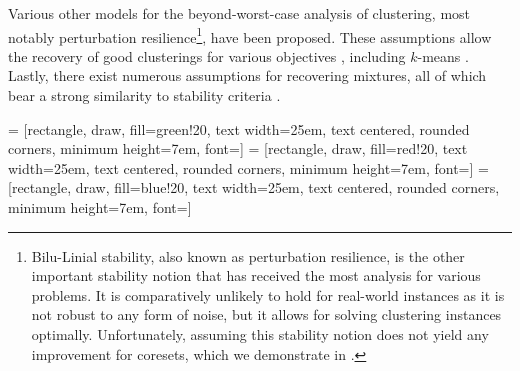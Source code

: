 \documentclass[11pt]{article}
\theoremstyle{restate}
\theoremstyle{definition}
\begin{document}
Various other models for the beyond-worst-case analysis of clustering, most notably perturbation resilience\footnote{Bilu-Linial stability, also known as perturbation resilience, is the other important stability notion that has received the most analysis for various problems. It is comparatively unlikely to hold for real-world instances as it is not robust to any form of noise, but it allows for solving clustering instances optimally. Unfortunately, assuming this stability notion does not yield any improvement for coresets, which we demonstrate in .}\cite{BiL12}, have been proposed.  These assumptions allow the recovery of good clusterings for various objectives  \cite{ABS12,BalcanHW20,BalcanL16,MakarychevMV14}, including $k$-means \cite{AngelidakisMM17}.
Lastly, there exist numerous assumptions for recovering mixtures, all of which bear a strong similarity to stability criteria \cite{Das99,ArK01,VeW04,DaS07,BrV08,KSV08,AwS12}.








 = [rectangle, draw, fill=green!20, 
    text width=25em, text centered, rounded corners, minimum height=7em, font=\huge]
 = [rectangle, draw, fill=red!20, 
    text width=25em, text centered, rounded corners, minimum height=7em, font=\huge]
 = [rectangle, draw, fill=blue!20, 
    text width=25em, text centered, rounded corners, minimum height=7em, font=\huge]
\end{document}
